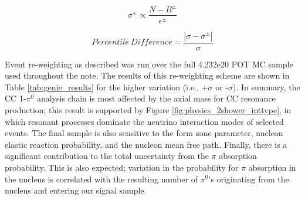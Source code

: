 \begin{equation} \label{eq:genie_xsec_var}
  \sigma^\pm \propto \frac{N - B^\pm}{\epsilon^\pm} 
\end{equation}

\begin{equation} \label{eq:genie_xsec_percentdiff}
  Percentile\ Difference = \frac{| \sigma - \sigma^\pm |}{\sigma} 
\end{equation}

\par Event re-weighting as described was run over the full 4.232e20 POT MC sample used throughout the note. The results of this re-weighting scheme are shown in Table \ref{tab:genie_results} for the higher variation (i.e., +$\sigma$ or -$\sigma$). In summary, the CC 1-$\pi^0$ analysis chain is most affected by the axial mass for CC resonance production;  this result is supported by Figure \ref{fig:physics_2shower_inttype}, in which resonant processes dominate the neutrino interaction modes of selected events. The final sample is also sensitive to the form zone parameter, nucleon elastic reaction probability, and the nucleon mean free path.   Finally, there is a significant contribution to the total uncertainty from the $\pi$ absorption probability. This is also expected; variation in the probability for $\pi$ absorption in the nucleus is correlated with the resulting number of $\pi^0$'s originating from the nucleus and entering our signal sample.  

